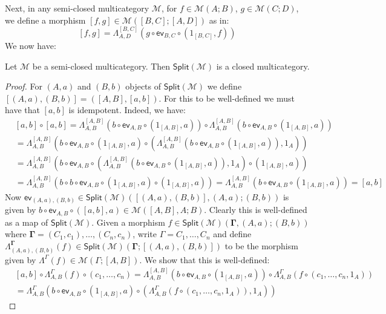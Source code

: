 \documentclass{llncs}
\begin{document}
Next, in any semi-closed multicategory $\mathcal{M}$, for $f \in \mathcal{M}(A;B)$, $g \in \mathcal{M}(C;D)$, we define a morphism $[f,g] \in \mathcal{M}([B,C];[A,D])$ as in:
\[
  [f,g] = \Lambda^{[B,C]}_{A,D}(g \circ \mathsf{ev}_{B,C} \circ (1_{[B,C]},f))
\]
We now have:
\begin{lemma}\label{lem:split-closed}
  Let $\mathcal{M}$ be a semi-closed multicategory. Then $\mathsf{Split}(\mathcal{M})$ is a closed multicategory.
\end{lemma}
\begin{proof}
  For $(A,a)$ and $(B,b)$ objects of $\mathsf{Split}(\mathcal{M})$ we define $[(A,a),(B,b)] = ([A,B],[a,b])$. For this to be well-defined we must have  that $[a,b]$ is idempotent. Indeed, we have:
  \begin{align*}
    & [a,b] \circ [a,b]
      = \Lambda^{[A,B]}_{A,B}(b \circ \mathsf{ev}_{A,B} \circ (1_{[A,B]},a)) \circ \Lambda^{[A,B]}_{A,B}(b \circ \mathsf{ev}_{A,B} \circ (1_{[A,B]},a))
    \\&= \Lambda^{[A,B]}_{A,B}(b \circ \mathsf{ev}_{A,B} \circ (1_{[A,B]},a) \circ ( \Lambda^{[A,B]}_{A,B}(b \circ \mathsf{ev}_{A,B} \circ (1_{[A,B]},a)),1_A) )
    \\&= \Lambda^{[A,B]}_{A,B}(b \circ \mathsf{ev}_{A,B} \circ ( \Lambda^{[A,B]}_{A,B}(b \circ \mathsf{ev}_{A,B} \circ (1_{[A,B]},a)),1_A)  \circ (1_{[A,B]},a) )
    \\&= \Lambda^{[A,B]}_{A,B}(b \circ b \circ \mathsf{ev}_{A,B} \circ (1_{[A,B]},a)\circ (1_{[A,B]},a))
    = \Lambda^{[A,B]}_{A,B}(b \circ \mathsf{ev}_{A,B} \circ (1_{[A,B]},a))
    = [a,b]
  \end{align*}
  Now $\mathsf{ev}_{(A,a),(B,b)} \in \mathsf{Split}(\mathcal{M})([(A,a),(B,b)],(A,a) ; (B,b))$ is given by $b \circ \mathsf{ev}_{A,B} \circ ([a,b],a) \in \mathcal{M}([A,B],A;B)$. Clearly this is well-defined as a map of $\mathsf{Split}(\mathcal{M})$. Given a morphism $f \in \mathsf{Split}(\mathcal{M})(\mathbf{\Gamma},(A,a);(B,b))$ where $\mathbf{\Gamma} = (C_1,c_1),\ldots,(C_n,c_n)$, write $\Gamma = C_1,\ldots,C_n$ and define $\Lambda^\mathbf{\Gamma}_{(A,a),(B,b)}(f) \in \mathsf{Split}(\mathcal{M})(\mathbf{\Gamma};[(A,a),(B,b)])$ to be the morphism given by $\Lambda^\Gamma(f) \in \mathcal{M}(\Gamma;[A,B])$. We show that this is well-defined:
  \begin{align*}
    & [a,b] \circ \Lambda^\Gamma_{A,B}(f) \circ (c_1,\ldots,c_n)
      = \Lambda^{[A,B]}_{A,B}(b \circ \mathsf{ev}_{A,B} \circ (1_{[A,B]},a)) \circ \Lambda^\Gamma_{A,B}(f \circ (c_1,\ldots,c_n,1_A))
    \\&= \Lambda^{\Gamma}_{A,B}(b \circ \mathsf{ev}_{A,B} \circ (1_{[A,B]},a) \circ (\Lambda^\Gamma_{A,B}(f \circ (c_1,\ldots,c_n,1_A)),1_A))

\end{align*}
\end{proof}
\end{document}

